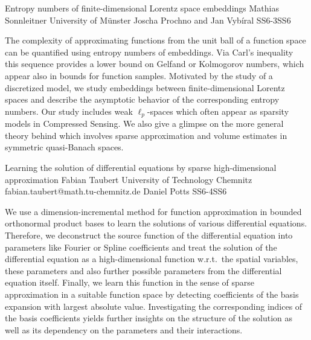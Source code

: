 \begin{talk}
  {Entropy numbers of finite-dimensional Lorentz space embeddings}%
  {Mathias Sonnleitner}%
  {University of M\"unster}%
  {}%
  {Joscha Prochno and Jan Vyb\'iral}%
{}{}{SS6-3}{SS6}

The complexity of approximating functions from the unit ball of a function space can be quantified using entropy numbers of embeddings. Via Carl's inequality this sequence provides a lower bound on Gelfand or Kolmogorov numbers, which appear also in bounds for function samples. Motivated by the study of a discretized model, we study embeddings between finite-dimensional Lorentz spaces and describe the asymptotic behavior of the corresponding entropy numbers. Our study includes weak $\ell_p$-spaces which often appear as sparsity models in Compressed Sensing. We also give a glimpse on the more general theory behind which involves sparse approximation and volume estimates in symmetric quasi-Banach spaces.
\end{talk}

\begin{talk}
  {Learning the solution of differential equations by sparse high-dimensional approximation}%
  {Fabian Taubert}%
  {University of Technology Chemnitz}%
  {fabian.taubert@math.tu-chemnitz.de}%
  {Daniel Potts}%
{}{}{SS6-4}{SS6}


We use a dimension-incremental method for function approximation in bounded orthonormal product bases to learn the solutions of various differential equations. Therefore, we deconstruct the source function of the differential equation into parameters like Fourier or Spline coefficients and treat the solution of the differential equation as a high-dimensional function w.r.t.\ the spatial variables, these parameters and also further possible parameters from the differential equation itself. Finally, we learn this function in the sense of sparse approximation in a suitable function space by detecting coefficients of the basis expansion with largest absolute value. Investigating the corresponding indices of the basis coefficients yields further insights on the structure of the solution as well as its dependency on the parameters and their interactions.
\end{talk}


